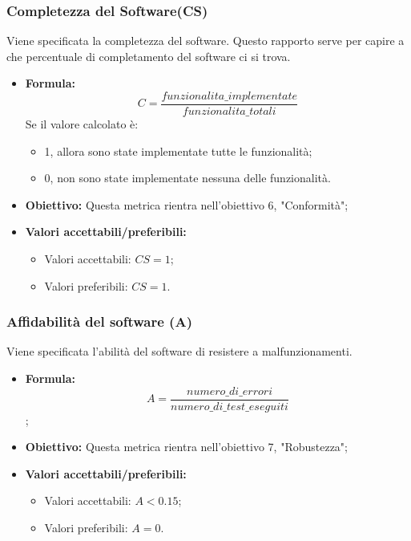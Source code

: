 \subsubsection{Completezza del Software(CS)}
Viene specificata la completezza del software. Questo rapporto serve per capire a che percentuale di completamento del software ci si trova.
\begin{itemize}
	\item \textbf{Formula:} \[C = \frac{funzionalita\_implementate }{funzionalita\_totali}\]
	Se il valore calcolato è:
	\begin{itemize}
		\item 1, allora sono state implementate tutte le funzionalità;
		\item 0, non sono state implementate nessuna delle funzionalità.
	\end{itemize}
	\item \textbf{Obiettivo:} Questa metrica rientra nell'obiettivo 6, "Conformità";
	\item \textbf{Valori accettabili/preferibili: }
	\begin{itemize}
		\item Valori accettabili: $CS = 1$;
		\item Valori preferibili: $CS = 1$.
	\end{itemize}
\end{itemize}


\subsubsection{Affidabilità del software (A)}
Viene specificata l'abilità del software di resistere a malfunzionamenti.
\begin{itemize}
	\item \textbf{Formula:} \[A = \frac{numero\_di\_errori}{numero\_di\_test\_eseguiti}\];
	\item \textbf{Obiettivo:} Questa metrica rientra nell'obiettivo 7, "Robustezza";
	\item \textbf{Valori accettabili/preferibili: }
	\begin{itemize}
		\item Valori accettabili: $A < 0.15$;
		\item Valori preferibili: $A = 0$.
	\end{itemize}
\end{itemize}


